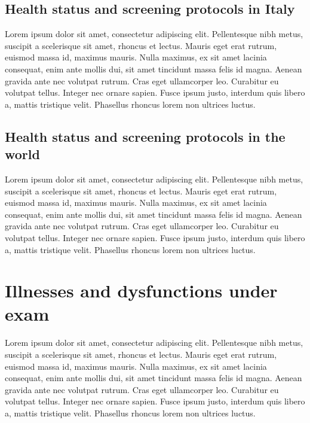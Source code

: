 \subsection{Health status and screening protocols in Italy}\label{sub:healthstatusandscreeningprotocolsinitaly}
Lorem ipsum dolor sit amet, consectetur adipiscing elit. Pellentesque nibh metus, suscipit a scelerisque sit amet, rhoncus et lectus. Mauris eget erat rutrum, euismod massa id, maximus mauris. Nulla maximus, ex sit amet lacinia consequat, enim ante mollis dui, sit amet tincidunt massa felis id magna. Aenean gravida ante nec volutpat rutrum. Cras eget ullamcorper leo. Curabitur eu volutpat tellus. Integer nec ornare sapien. Fusce ipsum justo, interdum quis libero a, mattis tristique velit. Phasellus rhoncus lorem non ultrices luctus.

\subsection{Health status and screening protocols in the world}\label{sub:healthstatusandscreeningprotocolsinworld}
Lorem ipsum dolor sit amet, consectetur adipiscing elit. Pellentesque nibh metus, suscipit a scelerisque sit amet, rhoncus et lectus. Mauris eget erat rutrum, euismod massa id, maximus mauris. Nulla maximus, ex sit amet lacinia consequat, enim ante mollis dui, sit amet tincidunt massa felis id magna. Aenean gravida ante nec volutpat rutrum. Cras eget ullamcorper leo. Curabitur eu volutpat tellus. Integer nec ornare sapien. Fusce ipsum justo, interdum quis libero a, mattis tristique velit. Phasellus rhoncus lorem non ultrices luctus.

\section{Illnesses and dysfunctions under exam}\label{sec:illnessesanddysfunctions}
Lorem ipsum dolor sit amet, consectetur adipiscing elit. Pellentesque nibh metus, suscipit a scelerisque sit amet, rhoncus et lectus. Mauris eget erat rutrum, euismod massa id, maximus mauris. Nulla maximus, ex sit amet lacinia consequat, enim ante mollis dui, sit amet tincidunt massa felis id magna. Aenean gravida ante nec volutpat rutrum. Cras eget ullamcorper leo. Curabitur eu volutpat tellus. Integer nec ornare sapien. Fusce ipsum justo, interdum quis libero a, mattis tristique velit. Phasellus rhoncus lorem non ultrices luctus.


